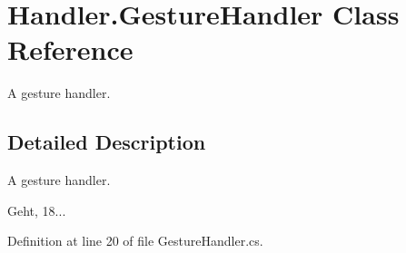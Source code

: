 \section{Handler.\-Gesture\-Handler Class Reference}
\label{class_handler_1_1_gesture_handler}


A gesture handler.  




\subsection{Detailed Description}
A gesture handler. 

Geht, 18... 

Definition at line 20 of file Gesture\-Handler.\-cs.

